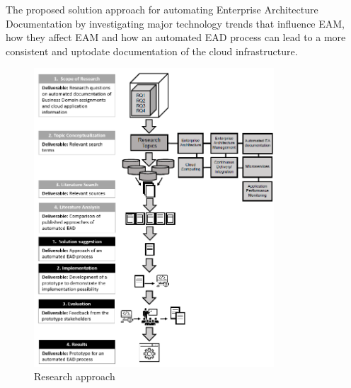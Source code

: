 The proposed solution approach for automating Enterprise Architecture Documentation by investigating major technology trends that influence EAM, how they affect EAM and how an automated EAD process can lead to a more consistent and uptodate documentation of the cloud infrastructure.
\begin{figure}[htpb]
  \centering
  \includegraphics[width=0.8\textwidth]{figures/approach.PNG}
  \caption{Research approach}
  \label{fig:research-approach}
\end{figure}